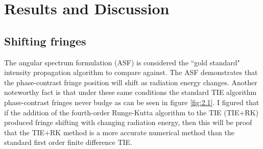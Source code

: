 \documentclass[10pt, a4paper, singlespacing]{report}
\begin{document}

\section{Results and Discussion}\label{Results}

\subsection{Shifting fringes}\label{betterthan}

The angular spectrum formulation (ASF) is considered the ``gold standard" intensity propagation algorithm to compare against. The ASF demonstrates that the phase-contrast fringe position will shift as radiation energy changes. Another noteworthy fact is that under these same conditions the standard TIE algorithm phase-contrast fringes never budge as can be seen in figure \ref{fig:2.1}. I figured that if the addition of the fourth-order Runge-Kutta algorithm to the TIE (TIE+RK) produced fringe shifting with changing radiation energy, then this will be proof that the TIE+RK method is a more accurate numerical method than the standard first order finite difference TIE.
\end{document}
